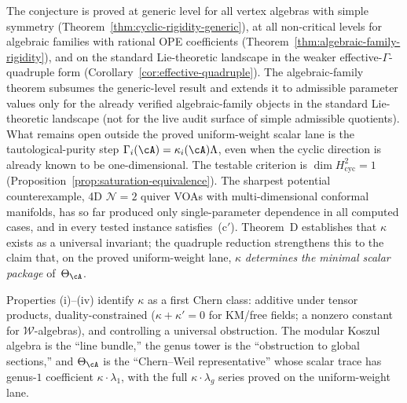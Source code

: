 \begin{remark}
\label{rem:scalar-saturation-evidence}
The conjecture is proved at generic level for all vertex algebras
with simple symmetry (Theorem~\ref{thm:cyclic-rigidity-generic}),
at all non-critical levels for algebraic families with rational
OPE coefficients
(Theorem~\ref{thm:algebraic-family-rigidity}),
and on the standard Lie-theoretic landscape in the weaker
effective-\(\Gamma\)-quadruple form
(Corollary~\ref{cor:effective-quadruple}).
The algebraic-family theorem subsumes the generic-level result
and extends it to admissible parameter values only for the
already verified algebraic-family objects in the standard
Lie-theoretic landscape \textup{(}not for the live audit surface
of simple admissible quotients\textup{)}.
What remains open outside the proved uniform-weight scalar lane is
the tautological-purity step
$\Gamma_i(\cA)=\kappa_i(\cA)\Lambda$,
even when the cyclic direction is already known to be
one-dimensional.
The testable criterion is $\dim H^2_{\mathrm{cyc}} = 1$
(Proposition~\ref{prop:saturation-equivalence}).
The sharpest potential counterexample, 4D $\mathcal{N}=2$
quiver VOAs with multi-dimensional conformal manifolds,
has so far produced only single-parameter dependence in all
computed cases, and in every tested instance satisfies~(c$'$).
Theorem~D establishes that $\kappa$ exists as a universal
invariant; the quadruple reduction strengthens this to the
claim that, on the proved uniform-weight lane, $\kappa$
\emph{determines the minimal scalar package} of~$\Theta_{\cA}$.
\end{remark}

\begin{remark}
\label{rem:kappa-first-chern}
Properties (i)--(iv) identify $\kappa$ as a first Chern class:
additive under tensor products, duality-constrained
($\kappa + \kappa' = 0$ for KM/free fields; a nonzero constant for
$\mathcal{W}$-algebras), and controlling a universal obstruction.
The modular Koszul algebra is the ``line bundle,'' the genus tower is
the ``obstruction to global sections,'' and $\Theta_{\cA}$ is the
``Chern--Weil representative'' whose scalar trace has genus-$1$
coefficient $\kappa \cdot \lambda_1$, with the full
$\kappa \cdot \lambda_g$ series proved on the uniform-weight lane.
\end{remark}

